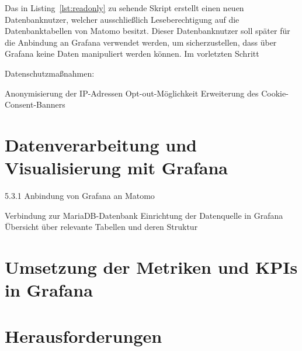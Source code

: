 Das in Listing~\ref{lst:readonly} zu sehende Skript erstellt einen neuen Datenbanknutzer, welcher ausschließlich Leseberechtigung auf die Datenbanktabellen von Matomo besitzt. Dieser Datenbanknutzer soll später für die Anbindung an Grafana verwendet werden, um sicherzustellen, dass über Grafana keine Daten manipuliert werden können. Im vorletzten Schritt 


Datenschutzmaßnahmen:

    Anonymisierung der IP-Adressen
    Opt-out-Möglichkeit
    Erweiterung des Cookie-Consent-Banners

\section{Datenverarbeitung und Visualisierung mit Grafana}
5.3.1 Anbindung von Grafana an Matomo

    Verbindung zur MariaDB-Datenbank
    Einrichtung der Datenquelle in Grafana
    Übersicht über relevante Tabellen und deren Struktur

\section{Umsetzung der Metriken und KPIs in Grafana}


\section{Herausforderungen }